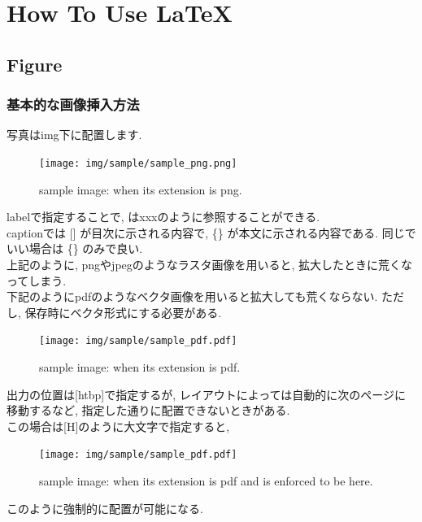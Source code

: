 \chapter{How To Use \LaTeX}

\section{Figure}
    \subsection{基本的な画像挿入方法}
    写真はimg下に配置します.\\
    \begin{figure}[htbp]
        \centering   
        \texttt{[image: img/sample/sample\_png.png]}
        \label{fig:sample_png}
        \caption[sample image (png)]{sample image: when its extension is png.}
    \end{figure}
    labelで指定することで, はxxxのように参照することができる.\\
    captionでは [] が目次に示される内容で, \{\} が本文に示される内容である. 同じでいい場合は \{\} のみで良い.\\
    上記のように, pngやjpegのようなラスタ画像を用いると, 拡大したときに荒くなってしまう.\\
    下記のようにpdfのようなベクタ画像を用いると拡大しても荒くならない.
    ただし, 保存時にベクタ形式にする必要がある.
    \begin{figure}[htbp]
        \centering   
        \texttt{[image: img/sample/sample\_pdf.pdf]}
        \label{Fig:sample_pdf}
        \caption[sample image (pdf)]{sample image: when its extension is pdf.}
    \end{figure}
    出力の位置は[htbp]で指定するが, レイアウトによっては自動的に次のページに移動するなど, 指定した通りに配置できないときがある.\\
    この場合は[H]のように大文字で指定すると,
    \begin{figure}[H]
        \centering   
        \texttt{[image: img/sample/sample\_pdf.pdf]}
        \label{Fig:sample_pdf_here}
        \caption[sample image (pdf, here)]{sample image: when its extension is pdf and is enforced to be here.}
    \end{figure}
    このように強制的に配置が可能になる.

